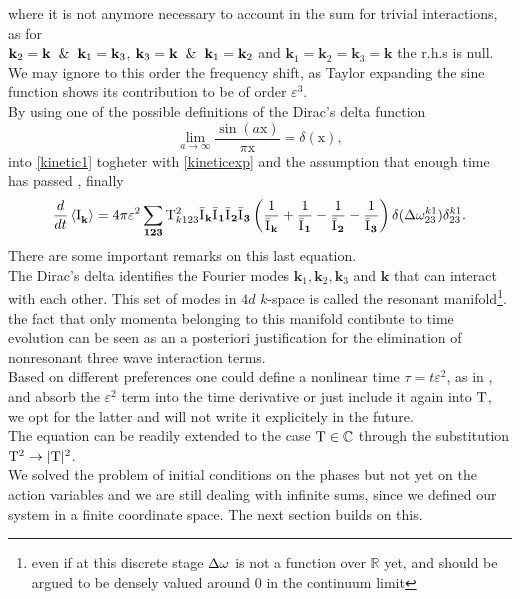 where it is not anymore necessary to account in the sum for trivial 
interactions, as for \\ $\mathbf{k}_2=\mathbf{k} \hspace{2mm}\&\hspace{2mm} \mathbf{k}_1 = \mathbf{k}_3$, $\mathbf{k}_3=\mathbf{k} \hspace{2mm}\& \hspace{2mm}\mathbf{k}_1=\mathbf{k}_2$ 
and $\mathbf{k}_1=\mathbf{k}_2=\mathbf{k}_3=\mathbf{k}$ the r.h.s is null.\\
We may ignore to this order the frequency shift, as Taylor expanding the sine function shows its contribution to be of order $\varepsilon^3$. \\
By using one of the possible definitions of the Dirac's delta function
\begin{equation}
    \underset{a \rightarrow \infty}{\lim} \frac{\sin(a \mathrm{x})}{\pi\mathrm{x}} = \delta(\mathrm{x}),
    \label{delta}
\end{equation}
into \eqref{kinetic1} togheter with \eqref{kineticexp} and the assumption that enough time has passed
, finally
\begin{equation}
    \frac{d}{dt} \left\langle \mathrm{I}^{}_\mathbf{k}\right\rangle = 4 \pi\varepsilon^2 \sum_{\mathbf{123}} \mathrm{T}^2_{k123}\bar{\mathrm{I}^{}}_\mathbf{k}\bar{\mathrm{I}^{}}_\mathbf{1}\bar{\mathrm{I}^{}}_\mathbf{2}\bar{\mathrm{I}^{}}_\mathbf{3}
    \left(\frac{1}{\bar{\mathrm{I}^{}}_\mathbf{k}} + \frac{1}{\bar{\mathrm{I}^{}}_\mathbf{1}} - \frac{1}{\bar{\mathrm{I}^{}}_\mathbf{2}}- \frac{1}{\bar{\mathrm{I}^{}}_\mathbf{3}}  \right)
    \delta(\Delta{\omega}^{k1}_{23})\delta^{k1}_{23}.
    \label{kinetic2}
\end{equation}
There are some important remarks on this last equation. \\
The Dirac's delta identifies the Fourier modes $\mathbf{k}_1, \mathbf{k}_2,\mathbf{k}_3$ and $\mathbf{k}$ that can interact with each other.
This set of modes in $4d$ $k$-space is called the resonant manifold\footnote{even if at this discrete stage $\Delta{\omega}$ is not a function over $\mathbb{R}$ yet,
 and should be argued to be densely valued around $0$ in the continuum limit}. the fact that only momenta belonging to this manifold contibute to time evolution
  can be seen as an a posteriori justification for the elimination of nonresonant three wave interaction terms. \\
Based on different preferences one could define a nonlinear time $\tau = t \varepsilon^2$, as in \cite{Onorato2020}, and absorb the 
$\varepsilon^2$ term into the time derivative or just include it again into $\mathrm{T}$, we opt for the latter and will not write it explicitely in the future. \\
The equation can be readily extended to the case $\mathrm{T} \in \mathbb{C}$ through the substitution $\mathrm{T}^2 \rightarrow |\mathrm{T}|^2$.\\
We solved the problem of initial conditions on the phases but not yet on the action variables and we are still dealing with infinite sums, since we defined our system
in a finite coordinate space. The next section builds on this. \\

